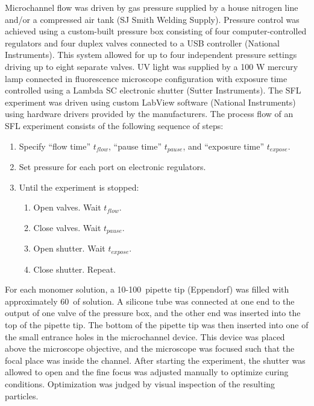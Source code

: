 Microchannel flow was driven by gas pressure supplied by a house nitrogen line and/or a compressed air tank 
(SJ Smith Welding Supply). Pressure control was achieved using a custom-built pressure box consisting of
four computer-controlled regulators and four duplex valves connected to a USB
controller (National Instruments). This system allowed for 
up to four independent pressure
settings driving up to eight separate valves. UV light was supplied by a 100 W mercury lamp
connected in fluorescence microscope configuration with exposure time controlled using a Lambda SC 
electronic shutter (Sutter Instruments).
The SFL experiment was driven using custom LabView software (National Instruments) using
hardware drivers provided by the manufacturers. The process
flow of an SFL experiment consists of the following sequence of steps:

\begin{enumerate}
\item Specify ``flow time'' $t_{flow}$, ``pause time'' $t_{pause}$, and 
``exposure time'' $t_{expose}$.
\item Set pressure for each port on electronic regulators.
\item Until the experiment is stopped:
\begin{enumerate}
\item Open valves. Wait $t_{flow}$.
\item Close valves. Wait $t_{pause}$.
\item Open shutter. Wait $t_{expose}$.
\item Close shutter. Repeat.
\end{enumerate}
\end{enumerate}

For each monomer solution, a 10-100\uL~pipette tip (Eppendorf) was filled with approximately 60\uL~of solution.
A silicone tube was connected at one end to the output of one valve of the pressure box, and the other end
was inserted into the top of the pipette tip.  The bottom of the pipette tip was then inserted into one of the
small entrance holes in the microchannel device.  This device was placed above the microscope objective,
and the microscope was focused such that the focal place was inside the channel.  After starting the 
experiment, the shutter was allowed to open and the fine focus was adjusted manually to optimize
curing conditions. Optimization was judged by visual inspection of the resulting particles. 


